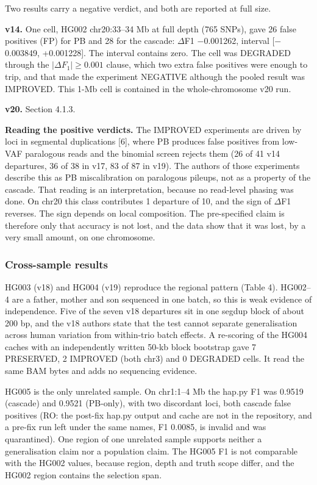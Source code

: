 \documentclass[11pt,a4paper]{article}
\makeatletter
\newcommand{\needspace}[1]{\par\ifdim\pagegoal=\maxdimen\else\dimen@=\pagegoal\advance\dimen@-\pagetotal\ifdim\dimen@<#1\relax\newpage\fi\fi}
\makeatother
\begin{document}
Two results carry a negative verdict, and both are reported at full size.

\textbf{v14.} One cell, HG002 chr20:33--34 Mb at full depth (765 SNPs), gave 26 false positives (FP) for PB and 28 for the cascade: $\Delta$F1 $-$0.001262, interval [$-$0.003849, +0.001228]. The interval contains zero. The cell was DEGRADED through the $|\Delta F_1| \ge 0.001$ clause, which two extra false positives were enough to trip, and that made the experiment NEGATIVE although the pooled result was IMPROVED. This 1-Mb cell is contained in the whole-chromosome v20 run.

\textbf{v20.} Section 4.1.3.

\textbf{Reading the positive verdicts.} The IMPROVED experiments are driven by loci in segmental duplications [6], where PB produces false positives from low-VAF paralogous reads and the binomial screen rejects them (26 of 41 v14 departures, 36 of 38 in v17, 83 of 87 in v19). The authors of those experiments describe this as PB miscalibration on paralogous pileups, not as a property of the cascade. That reading is an interpretation, because no read-level phasing was done. On chr20 this class contributes 1 departure of 10, and the sign of $\Delta$F1 reverses. The sign depends on local composition. The pre-specified claim is therefore only that accuracy is not lost, and the data show that it was lost, by a very small amount, on one chromosome.

\needspace{5\baselineskip}
\subsubsection{\texorpdfstring{Cross-sample results}{Cross-sample results}}
HG003 (v18) and HG004 (v19) reproduce the regional pattern (Table 4). HG002--4 are a father, mother and son sequenced in one batch, so this is weak evidence of independence. Five of the seven v18 departures sit in one segdup block of about 200 bp, and the v18 authors state that the test cannot separate generalisation across human variation from within-trio batch effects. A re-scoring of the HG004 caches with an independently written 50-kb block bootstrap gave 7 PRESERVED, 2 IMPROVED (both chr3) and 0 DEGRADED cells. It read the same BAM bytes and adds no sequencing evidence.

HG005 is the only unrelated sample. On chr1:1--4 Mb the hap.py F1 was 0.9519 (cascade) and 0.9521 (PB-only), with two discordant loci, both cascade false positives (RO: the post-fix hap.py output and cache are not in the repository, and a pre-fix run left under the same names, F1 0.0085, is invalid and was quarantined). One region of one unrelated sample supports neither a generalisation claim nor a population claim. The HG005 F1 is not comparable with the HG002 values, because region, depth and truth scope differ, and the HG002 region contains the selection span.
\end{document}
